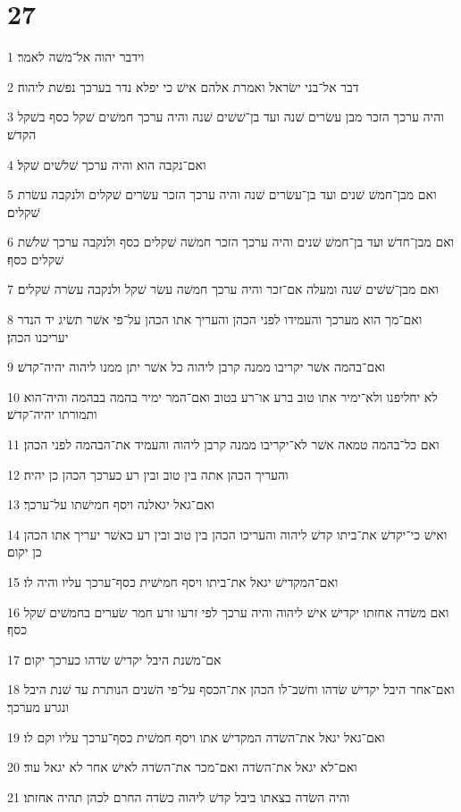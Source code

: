 \chapter{27}

\par 1 וידבר יהוה אל־משׁה לאמר׃
\par 2 דבר אל־בני ישׂראל ואמרת אלהם אישׁ כי יפלא נדר בערכך נפשׁת ליהוה׃
\par 3 והיה ערכך הזכר מבן עשׂרים שׁנה ועד בן־שׁשׁים שׁנה והיה ערכך חמשׁים שׁקל כסף בשׁקל הקדשׁ׃
\par 4 ואם־נקבה הוא והיה ערכך שׁלשׁים שׁקל׃
\par 5 ואם מבן־חמשׁ שׁנים ועד בן־עשׂרים שׁנה והיה ערכך הזכר עשׂרים שׁקלים ולנקבה עשׂרת שׁקלים׃
\par 6 ואם מבן־חדשׁ ועד בן־חמשׁ שׁנים והיה ערכך הזכר חמשׁה שׁקלים כסף ולנקבה ערכך שׁלשׁת שׁקלים כסף׃
\par 7 ואם מבן־שׁשׁים שׁנה ומעלה אם־זכר והיה ערכך חמשׁה עשׂר שׁקל ולנקבה עשׂרה שׁקלים׃
\par 8 ואם־מך הוא מערכך והעמידו לפני הכהן והעריך אתו הכהן על־פי אשׁר תשׂיג יד הנדר יעריכנו הכהן׃
\par 9 ואם־בהמה אשׁר יקריבו ממנה קרבן ליהוה כל אשׁר יתן ממנו ליהוה יהיה־קדשׁ׃
\par 10 לא יחליפנו ולא־ימיר אתו טוב ברע או־רע בטוב ואם־המר ימיר בהמה בבהמה והיה־הוא ותמורתו יהיה־קדשׁ׃
\par 11 ואם כל־בהמה טמאה אשׁר לא־יקריבו ממנה קרבן ליהוה והעמיד את־הבהמה לפני הכהן׃
\par 12 והעריך הכהן אתה בין טוב ובין רע כערכך הכהן כן יהיה׃
\par 13 ואם־גאל יגאלנה ויסף חמישׁתו על־ערכך׃
\par 14 ואישׁ כי־יקדשׁ את־ביתו קדשׁ ליהוה והעריכו הכהן בין טוב ובין רע כאשׁר יעריך אתו הכהן כן יקום׃
\par 15 ואם־המקדישׁ יגאל את־ביתו ויסף חמישׁית כסף־ערכך עליו והיה לו׃
\par 16 ואם משׂדה אחזתו יקדישׁ אישׁ ליהוה והיה ערכך לפי זרעו זרע חמר שׂערים בחמשׁים שׁקל כסף׃
\par 17 אם־משׁנת היבל יקדישׁ שׂדהו כערכך יקום׃
\par 18 ואם־אחר היבל יקדישׁ שׂדהו וחשׁב־לו הכהן את־הכסף על־פי השׁנים הנותרת עד שׁנת היבל ונגרע מערכך׃
\par 19 ואם־גאל יגאל את־השׂדה המקדישׁ אתו ויסף חמשׁית כסף־ערכך עליו וקם לו׃
\par 20 ואם־לא יגאל את־השׂדה ואם־מכר את־השׂדה לאישׁ אחר לא יגאל עוד׃
\par 21 והיה השׂדה בצאתו ביבל קדשׁ ליהוה כשׂדה החרם לכהן תהיה אחזתו׃
